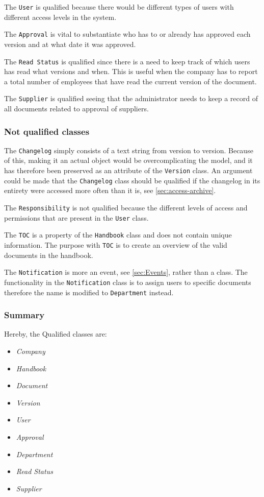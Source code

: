 The \texttt{User} is qualified because there would be different types of users with different access levels in the system.

The \texttt{Approval} is vital to substantiate who has to or already has approved each version and at what date it was approved.

The \texttt{Read Status} is qualified since there is a need to keep track of which users has read what versions and when.
This is useful when the company has to report a total number of employees that have read the current version of the document.

The \texttt{Supplier} is qualified seeing that the administrator needs to keep a record of all documents related to approval of suppliers.

\subsubsection*{Not qualified classes}

The \texttt{Changelog} simply consists of a text string from version to version.
Because of this, making it an actual object would be overcomplicating the model, and it has therefore been preserved as an attribute of the \texttt{Version} class.
An argument could be made that the \texttt{Changelog} class should be qualified if the changelog in its entirety were accessed more often than it is, see \cref{sec:access-archive}.

The \texttt{Responsibility} is not qualified because the different levels of access and permissions that are present in the \texttt{User} class.

The \texttt{TOC} is a property of the \texttt{Handbook} class and does not contain unique information.
The purpose with \texttt{TOC} is to create an overview of the valid documents in the handbook.

The \texttt{Notification} is more an event, see \cref{sec:Events}, rather than a class.
The functionality in the \texttt{Notification} class is to assign users to specific documents therefore the name is modified to \texttt{Department} instead.

\subsubsection*{Summary}
Hereby, the Qualified classes are:
\begin{multicols}{4}
	\begin{itemize}
	\item \textit{Company}
	\item \textit{Handbook}
	\item \textit{Document}
	\item \textit{Version}
	\item \textit{User}
	\item \textit{Approval}
	\item \textit{Department}
	\item \textit{Read Status}
	\item \textit{Supplier}
	\end{itemize}
\end{multicols}

